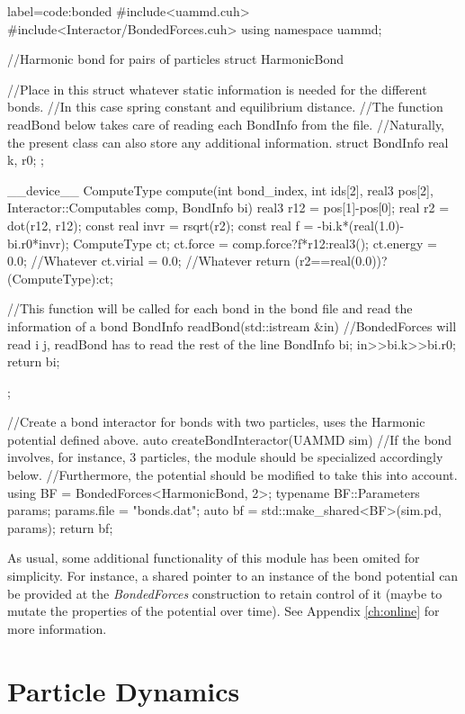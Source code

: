 \documentclass[ twoside,openright,titlepage,numbers=noenddot,%
headinclude,footinclude,cleardoublepage=empty,abstract=on,
BCOR=5mm,paper=b5,fontsize=11pt, dvipsnames
]{scrreprt}
\begin{document}
\begin{code2} {label=code:bonded}
#include<uammd.cuh>
#include<Interactor/BondedForces.cuh>
using namespace uammd;

//Harmonic bond for pairs of particles
struct HarmonicBond{
  //Place in this struct whatever static information is needed for the different bonds.
  //In this case spring constant and equilibrium distance.
  //The function readBond below takes care of reading each BondInfo from the file.
  //Naturally, the present class can also store any additional information.
  struct BondInfo{
    real k, r0;
  };

  __device__ ComputeType compute(int bond_index,
                        int ids[2], real3 pos[2],
                        Interactor::Computables comp,
                        BondInfo bi){
    real3 r12 = pos[1]-pos[0];
    real r2 = dot(r12, r12);
    const real invr = rsqrt(r2);
    const real f = -bi.k*(real(1.0)-bi.r0*invr);
    ComputeType ct;
    ct.force = comp.force?f*r12:real3();
    ct.energy = 0.0; //Whatever
    ct.virial = 0.0; //Whatever
    return (r2==real(0.0))?(ComputeType{}):ct;
  }

  //This function will be called for each bond in the bond file and read the information of a bond
  BondInfo readBond(std::istream &in){
    //BondedForces will read i j, readBond has to read the rest of the line
    BondInfo bi;
    in>>bi.k>>bi.r0;
    return bi;
  }
};

//Create a bond interactor for bonds with two particles, uses the Harmonic potential defined above.
auto createBondInteractor(UAMMD sim){
  //If the bond involves, for instance, 3 particles, the module should be specialized accordingly below.
  //Furthermore, the potential should be modified to take this into account.
  using BF = BondedForces<HarmonicBond, 2>;
  typename BF::Parameters params;
  params.file = "bonds.dat";
  auto bf = std::make_shared<BF>(sim.pd, params);
  return bf;
}

\end{code2}

As usual, some additional functionality of this module has been omited for simplicity. For instance, a shared pointer to an instance of the bond potential can be provided at the \emph{BondedForces} construction to retain control of it (maybe to mutate the properties of the potential over time). See Appendix \ref{ch:online} for more information.

\chapter{Particle Dynamics}\label{sec:dynamics}
\end{document}
